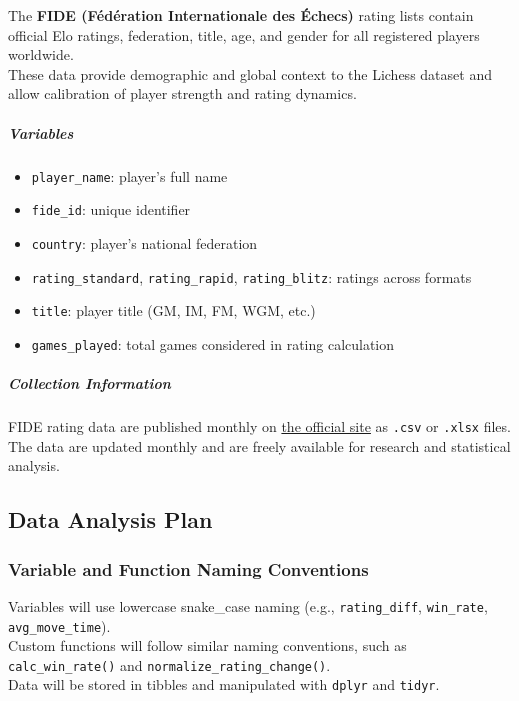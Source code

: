 \documentclass[
]{article}
\providecommand{\tightlist}{%
  \setlength{\itemsep}{0pt}\setlength{\parskip}{0pt}}
\begin{document}
The \textbf{FIDE (Fédération Internationale des Échecs)} rating lists
contain official Elo ratings, federation, title, age, and gender for all
registered players worldwide.\\
These data provide demographic and global context to the Lichess dataset
and allow calibration of player strength and rating dynamics.

\subparagraph{Variables}\label{variables-1}

\begin{itemize}
\tightlist
\item
  \texttt{player\_name}: player's full name\\
\item
  \texttt{fide\_id}: unique identifier\\
\item
  \texttt{country}: player's national federation\\
\item
  \texttt{rating\_standard}, \texttt{rating\_rapid},
  \texttt{rating\_blitz}: ratings across formats\\
\item
  \texttt{title}: player title (GM, IM, FM, WGM, etc.)\\
\item
  \texttt{games\_played}: total games considered in rating calculation
\end{itemize}

\subparagraph{Collection Information}\label{collection-information-1}

FIDE rating data are published monthly on
\href{https://ratings.fide.com/download_lists.phtml}{the official site}
as \texttt{.csv} or \texttt{.xlsx} files.\\
The data are updated monthly and are freely available for research and
statistical analysis.

\subsection{Data Analysis Plan}\label{data-analysis-plan}

\subsubsection{Variable and Function Naming
Conventions}\label{variable-and-function-naming-conventions}

Variables will use lowercase snake\_case naming (e.g.,
\texttt{rating\_diff}, \texttt{win\_rate}, \texttt{avg\_move\_time}).\\
Custom functions will follow similar naming conventions, such as
\texttt{calc\_win\_rate()} and \texttt{normalize\_rating\_change()}.\\
Data will be stored in tibbles and manipulated with \texttt{dplyr} and
\texttt{tidyr}.
\end{document}
